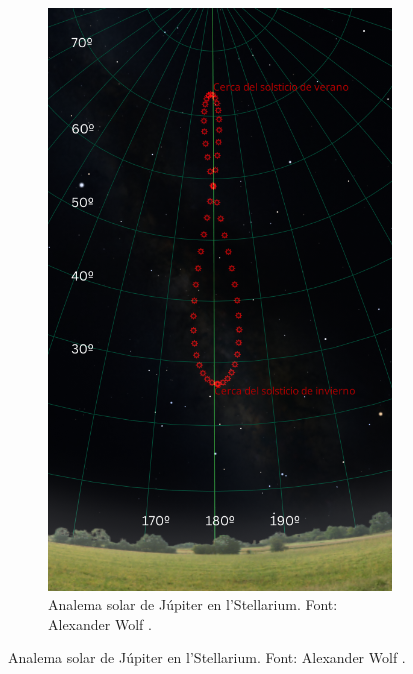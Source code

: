\documentclass[a4paper, 11pt]{article}
\begin{document}
\begin{figure}[h!]
    \begin{subfigure}{0.38\textwidth}
        \centering
        \includegraphics[width=\textwidth]{images/analema_Terra_stellarium.png}
        \caption{Analema solar de Júpiter en l'Stellarium. Font: Alexander Wolf \cite{SCRIPT_STELLARIUM}.}
    \end{subfigure}
\end{figure}

    \newpage
\end{document}
